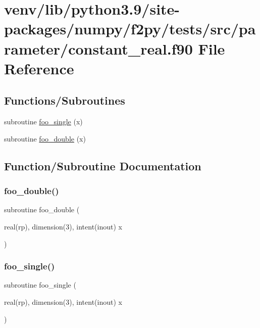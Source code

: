 \hypertarget{constant__real_8f90}{}\section{venv/lib/python3.9/site-\/packages/numpy/f2py/tests/src/parameter/constant\+\_\+real.f90 File Reference}
\label{constant__real_8f90}
\subsection*{Functions/\+Subroutines}
\begin{DoxyCompactItemize}
\item 
subroutine \hyperlink{constant__real_8f90_a5788b65ac7483301a444f42ed7b94002}{foo\+\_\+single} (x)
\item 
subroutine \hyperlink{constant__real_8f90_ac1829e0bf83d0da5b3f7accbc64b231e}{foo\+\_\+double} (x)
\end{DoxyCompactItemize}


\subsection{Function/\+Subroutine Documentation}
\mbox{\label{constant__real_8f90_ac1829e0bf83d0da5b3f7accbc64b231e}} 
\subsubsection{\texorpdfstring{foo\+\_\+double()}{foo\_double()}}
{\footnotesize\ttfamily subroutine foo\+\_\+double (\begin{DoxyParamCaption}\item[{real(rp), dimension(3), intent(inout)}]{x }\end{DoxyParamCaption})}

\mbox{\label{constant__real_8f90_a5788b65ac7483301a444f42ed7b94002}} 
\subsubsection{\texorpdfstring{foo\+\_\+single()}{foo\_single()}}
{\footnotesize\ttfamily subroutine foo\+\_\+single (\begin{DoxyParamCaption}\item[{real(rp), dimension(3), intent(inout)}]{x }\end{DoxyParamCaption})}

